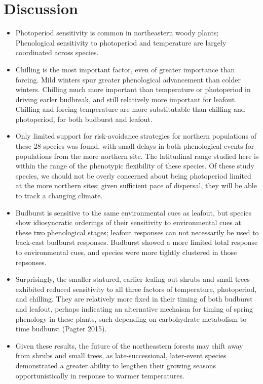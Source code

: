 \documentclass{article}
\begin{document}
\section*{Discussion}

\begin{itemize}

\item{Photoperiod sensitivity is common in northeastern woody plants; Phenological sensitivity to photoperiod and temperature are largely coordinated across species.}
\item{Chilling is the most important factor, even of greater importance than forcing. Mild winters spur greater phenological advancement than colder winters. Chilling much more important than temperature or photoperiod in driving earler budbreak, and still relatively more important for leafout. Chilling and forcing temperature are more substitutable than chilling and photoperiod, for both budburst and leafout.}
\item{Only limited support for risk-avoidance strategies for northern populations of these 28 species was found, with small delays in both phenological events for populations from the more northern site. The latitudinal range studied here is within the range of the phenotypic flexibility of these species. Of these study species, we should not be overly concerned about being photoperiod limited at the more northern sites; given sufficient pace of dispersal, they will be able to track a changing climate.}
\item{Budburst is sensitive to the same environmental cues as leafout, but species show idiosyncratic orderings of their sensitivity to environmental cues at these two phenological stages; leafout responses can not necessarily be used to back-cast budburst responses. Budburst showed a more limited total response to environmental cues, and species were more tightly clustered in those repsonses.}
\item{Surprisingly, the smaller statured, earlier-leafing out shrubs and small trees exhibited reduced sensitivity to all three factors of temperature, photoperiod, and chilling. They are relatively more fixed in their timing of both budburst and leafout, perhaps indicating an alternative mechaism for timing of spring phenology in these plants, such depending on carbohydrate metabolism to time budburst (Pagter 2015).}
\item{Given these results, the future of the northeastern forests may shift away from shrubs and small trees, as late-successional, later-event species demonstrated a greater ability to lengthen their growing seasons opportunistically in response to warmer temperatures.}
\end{itemize}
\end{document}
